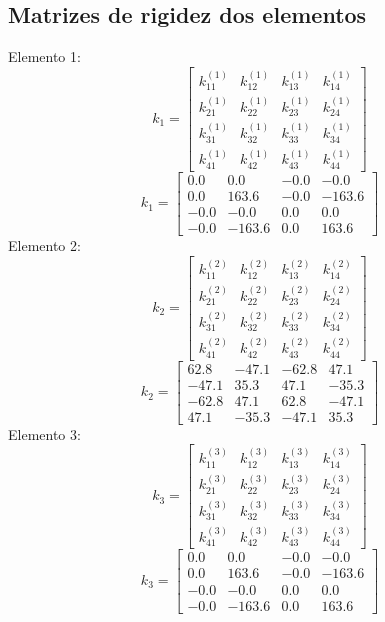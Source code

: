 \documentclass{article}%
\begin{document}
%
\subsection{Matrizes de rigidez dos elementos}%
\label{subsec:Matrizesderigidezdoselementos}%
Elemento {1}:%
\[%
k_{1}= \begin{bmatrix}%
k_{11}^{(1)}&k_{12}^{(1)}&k_{13}^{(1)}&k_{14}^{(1)}\\%
k_{21}^{(1)}&k_{22}^{(1)}&k_{23}^{(1)}&k_{24}^{(1)}\\%
k_{31}^{(1)}&k_{32}^{(1)}&k_{33}^{(1)}&k_{34}^{(1)}\\%
k_{41}^{(1)}&k_{42}^{(1)}&k_{43}^{(1)}&k_{44}^{(1)}%
\end{bmatrix}%
\]%
\[%
k_{1}= \begin{bmatrix}%
0.0&0.0&-0.0&-0.0\\%
0.0&163.6&-0.0&-163.6\\%
-0.0&-0.0&0.0&0.0\\%
-0.0&-163.6&0.0&163.6%
\end{bmatrix}%
\]%
Elemento {2}:%
\[%
k_{2}= \begin{bmatrix}%
k_{11}^{(2)}&k_{12}^{(2)}&k_{13}^{(2)}&k_{14}^{(2)}\\%
k_{21}^{(2)}&k_{22}^{(2)}&k_{23}^{(2)}&k_{24}^{(2)}\\%
k_{31}^{(2)}&k_{32}^{(2)}&k_{33}^{(2)}&k_{34}^{(2)}\\%
k_{41}^{(2)}&k_{42}^{(2)}&k_{43}^{(2)}&k_{44}^{(2)}%
\end{bmatrix}%
\]%
\[%
k_{2}= \begin{bmatrix}%
62.8&-47.1&-62.8&47.1\\%
-47.1&35.3&47.1&-35.3\\%
-62.8&47.1&62.8&-47.1\\%
47.1&-35.3&-47.1&35.3%
\end{bmatrix}%
\]%
Elemento {3}:%
\[%
k_{3}= \begin{bmatrix}%
k_{11}^{(3)}&k_{12}^{(3)}&k_{13}^{(3)}&k_{14}^{(3)}\\%
k_{21}^{(3)}&k_{22}^{(3)}&k_{23}^{(3)}&k_{24}^{(3)}\\%
k_{31}^{(3)}&k_{32}^{(3)}&k_{33}^{(3)}&k_{34}^{(3)}\\%
k_{41}^{(3)}&k_{42}^{(3)}&k_{43}^{(3)}&k_{44}^{(3)}%
\end{bmatrix}%
\]%
\[%
k_{3}= \begin{bmatrix}%
0.0&0.0&-0.0&-0.0\\%
0.0&163.6&-0.0&-163.6\\%
-0.0&-0.0&0.0&0.0\\%
-0.0&-163.6&0.0&163.6%
\end{bmatrix}%
\]%
\end{document}
